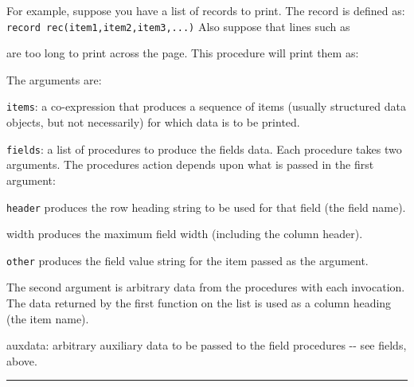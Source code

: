 For example, suppose you have a list of records to print. The record is
defined as:\\
\texttt{record rec(item1,item2,item3,...)} Also suppose that lines such
as


are too long to print across the page. This procedure will print them
as:


The arguments are:

\texttt{items}: a co-expression that produces a sequence of items
(usually structured data objects, but not necessarily) for which data
is to be printed.

\texttt{fields}: a list of procedures to produce the
field{\textquotesingle}s data. Each procedure takes two arguments. The
procedure{\textquotesingle}s action depends upon what is passed in the
first argument:

\texttt{header} produces the row heading string to be used for that
field (the field name).

\textsf{width} produces the maximum field width (including the column
header).

\texttt{other} produces the field value string for the item passed as
the argument.

The second argument is arbitrary data from the procedures with each
invocation. The data returned by the first function on the list is used
as a column heading (the item name).

\textsf{auxdata}: arbitrary auxiliary data to be passed to the field
procedures -{}- see {\textasciigrave}fields{\textquotesingle}, above.

\vspace{0.25cm}\hrule{}

